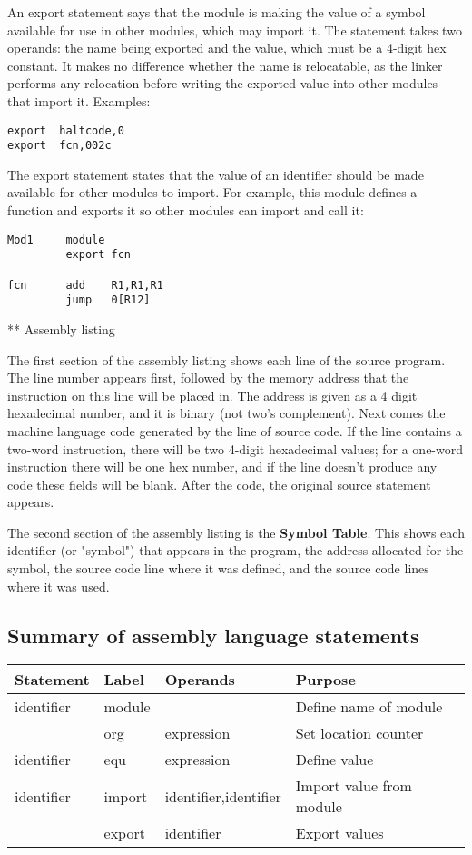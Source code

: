 \documentclass[11pt]{article}
\begin{document}
An export statement says that the module is making the value of a
symbol available for use in other modules, which may import it.  The
statement takes two operands: the name being exported and the value,
which must be a 4-digit hex constant.  It makes no difference whether
the name is relocatable, as the linker performs any relocation before
writing the exported value into other modules that import it.
Examples:

\begin{verbatim}
export  haltcode,0
export  fcn,002c
\end{verbatim}

The export statement states that the value of an identifier should be
made available for other modules to import.  For example, this module
defines a function and exports it so other modules can import and call
it:

\begin{verbatim}
Mod1     module
         export fcn

fcn      add    R1,R1,R1
         jump   0[R12]
\end{verbatim}

** Assembly listing

The first section of the assembly listing shows each line of the
source program.  The line number appears first, followed by the memory
address that the instruction on this line will be placed in.  The
address is given as a 4 digit hexadecimal number, and it is binary
(not two's complement).  Next comes the machine language code
generated by the line of source code.  If the line contains a two-word
instruction, there will be two 4-digit hexadecimal values; for a
one-word instruction there will be one hex number, and if the line
doesn't produce any code these fields will be blank.  After the code,
the original source statement appears.

The second section of the assembly listing is the \textbf{Symbol Table}.
This shows each identifier (or "symbol") that appears in the program,
the address allocated for the symbol, the source code line where it
was defined, and the source code lines where it was used.

\subsection*{Summary of assembly language statements}
\label{sec:org409b04b}

\begin{center}
\begin{tabular}{llll}
Statement & Label & Operands & Purpose\\
\hline
identifier & module &  & Define name of module\\
 & org & expression & Set location counter\\
identifier & equ & expression & Define value\\
identifier & import & identifier,identifier & Import  value  from module\\
 & export & identifier & Export values\\
\end{tabular}
\end{center}
\end{document}
